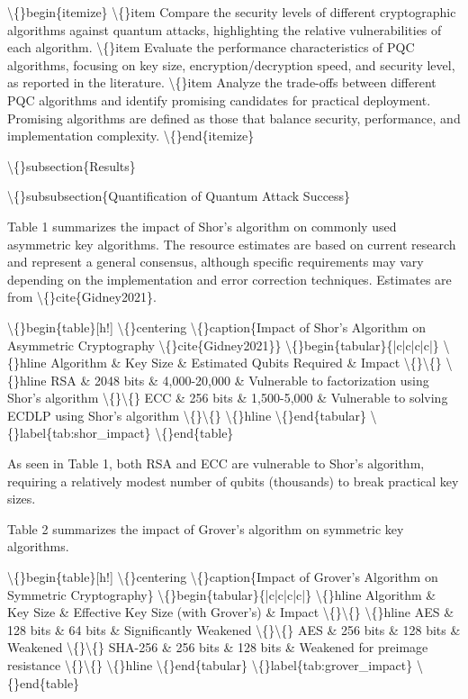 \documentclass{article}
\begin{document}
\textbackslash\{\}begin\{itemize\}
    \textbackslash\{\}item Compare the security levels of different cryptographic algorithms against quantum attacks, highlighting the relative vulnerabilities of each algorithm.
    \textbackslash\{\}item Evaluate the performance characteristics of PQC algorithms, focusing on key size, encryption/decryption speed, and security level, as reported in the literature.
    \textbackslash\{\}item Analyze the trade-offs between different PQC algorithms and identify promising candidates for practical deployment. Promising algorithms are defined as those that balance security, performance, and implementation complexity.
\textbackslash\{\}end\{itemize\}

\textbackslash\{\}subsection\{Results\}

\textbackslash\{\}subsubsection\{Quantification of Quantum Attack Success\}

Table 1 summarizes the impact of Shor's algorithm on commonly used asymmetric key algorithms. The resource estimates are based on current research and represent a general consensus, although specific requirements may vary depending on the implementation and error correction techniques. Estimates are from \textbackslash\{\}cite\{Gidney2021\}.

\textbackslash\{\}begin\{table\}[h!]
\textbackslash\{\}centering
\textbackslash\{\}caption\{Impact of Shor's Algorithm on Asymmetric Cryptography \textbackslash\{\}cite\{Gidney2021\}\}
\textbackslash\{\}begin\{tabular\}\{|c|c|c|c|\}
\textbackslash\{\}hline
Algorithm \& Key Size \& Estimated Qubits Required \& Impact \textbackslash\{\}\textbackslash\{\}
\textbackslash\{\}hline
RSA \& 2048 bits \& 4,000-20,000 \& Vulnerable to factorization using Shor's algorithm \textbackslash\{\}\textbackslash\{\}
ECC \& 256 bits \& 1,500-5,000 \& Vulnerable to solving ECDLP using Shor's algorithm \textbackslash\{\}\textbackslash\{\}
\textbackslash\{\}hline
\textbackslash\{\}end\{tabular\}
\textbackslash\{\}label\{tab:shor\_impact\}
\textbackslash\{\}end\{table\}

As seen in Table 1, both RSA and ECC are vulnerable to Shor's algorithm, requiring a relatively modest number of qubits (thousands) to break practical key sizes.

Table 2 summarizes the impact of Grover's algorithm on symmetric key algorithms.

\textbackslash\{\}begin\{table\}[h!]
\textbackslash\{\}centering
\textbackslash\{\}caption\{Impact of Grover's Algorithm on Symmetric Cryptography\}
\textbackslash\{\}begin\{tabular\}\{|c|c|c|c|\}
\textbackslash\{\}hline
Algorithm \& Key Size \& Effective Key Size (with Grover's) \& Impact \textbackslash\{\}\textbackslash\{\}
\textbackslash\{\}hline
AES \& 128 bits \& 64 bits \& Significantly Weakened \textbackslash\{\}\textbackslash\{\}
AES \& 256 bits \& 128 bits \& Weakened \textbackslash\{\}\textbackslash\{\}
SHA-256 \& 256 bits \& 128 bits \& Weakened for preimage resistance \textbackslash\{\}\textbackslash\{\}
\textbackslash\{\}hline
\textbackslash\{\}end\{tabular\}
\textbackslash\{\}label\{tab:grover\_impact\}
\textbackslash\{\}end\{table\}
\end{document}
